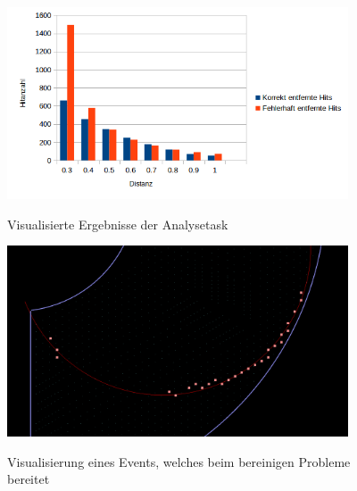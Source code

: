\begin{figure}
\begin{center}
  \includegraphics[width=0.9\textwidth]{Bilder/Results}
	\label{fig:results}
	\caption{Visualisierte Ergebnisse der Analysetask}
\end{center}
\end{figure}

\begin{figure}
\begin{center}
  \includegraphics[width=0.9\textwidth]{Bilder/Problems}
	\label{fig:Problem}
	\caption{Visualisierung eines Events, welches beim bereinigen Probleme bereitet}
\end{center}
\end{figure}